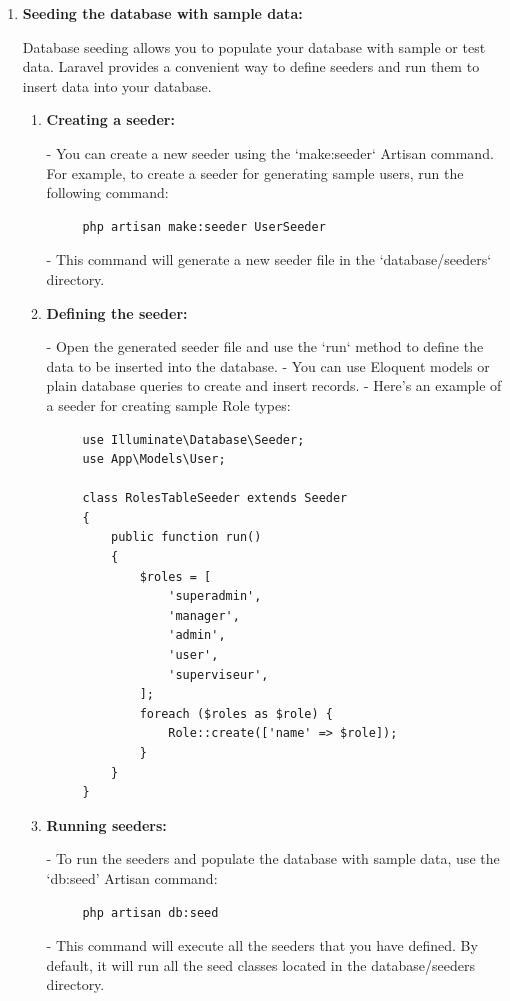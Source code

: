 \begin{enumerate}
\begin{enumerate}
- To run migrations and apply the changes to the database, use the `migrate` Artisan command:
   \begin{verbatim}
     php artisan migrate
    \end{verbatim}
   - This command will execute any pending migrations and update the database schema accordingly.
\end{enumerate}

\item \textbf{Seeding the database with sample data:}

\medskip Database seeding allows you to populate your database with sample or test data. Laravel provides a convenient way to define seeders and run them to insert data into your database.
\begin{enumerate}
    \item \textbf{Creating a seeder:}
   
    - You can create a new seeder using the `make:seeder` Artisan command. For example, to create a seeder for generating sample users, run the following command:
   \begin{verbatim}
     php artisan make:seeder UserSeeder
    \end{verbatim}
   - This command will generate a new seeder file in the `database/seeders` directory.

   \item \textbf{Defining the seeder:}
   
   - Open the generated seeder file and use the `run` method to define the data to be inserted into the database.
   - You can use Eloquent models or plain database queries to create and insert records.
   - Here's an example of a seeder for creating sample Role types:
\begin{verbatim}
     use Illuminate\Database\Seeder;
     use App\Models\User;

     class RolesTableSeeder extends Seeder
     {
         public function run()
         {
             $roles = [
                 'superadmin',
                 'manager',
                 'admin',
                 'user',
                 'superviseur',
             ];
             foreach ($roles as $role) {
                 Role::create(['name' => $role]);
             }
         }
     }
\end{verbatim}

\item \textbf{Running seeders:}
   
- To run the seeders and populate the database with sample data, use the `db:seed' Artisan command:
   \begin{verbatim}
     php artisan db:seed
    \end{verbatim}
   - This command will execute all the seeders that you have defined. By default, it will run all the seed classes located in the database/seeders directory.


\end{enumerate}
\end{enumerate}
